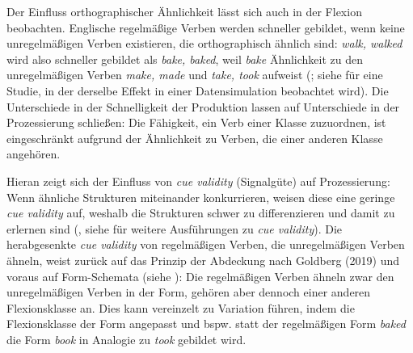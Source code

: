 Der Einfluss orthographischer Ähnlichkeit lässt sich auch in der Flexion beobachten. Englische regelmäßige Verben werden schneller gebildet, wenn keine unregelmäßigen Verben existieren, die orthographisch ähnlich sind: \textit{walk, walked} wird also schneller gebildet als \textit{bake, baked}, weil \textit{bake} Ähnlichkeit zu den unregelmäßigen Verben \textit{make, made} und \textit{take, took} aufweist (\cite[102--104]{Seidenberg.1992}; siehe \cite[371--387]{Daugherty.1994} für eine Studie, in der derselbe Effekt in einer Datensimulation beobachtet wird). Die Unterschiede in der Schnelligkeit der Produktion lassen auf Unterschiede in der Prozessierung schließen: Die Fähigkeit, ein Verb einer Klasse zuzuordnen, ist eingeschränkt aufgrund der Ähnlichkeit zu Verben, die einer anderen Klasse angehören. 

Hieran zeigt sich der Einfluss von \textit{cue validity} (Signalgüte) auf Prozessierung: Wenn ähnliche Strukturen miteinander konkurrieren, weisen diese eine geringe \textit{cue validity} auf, weshalb die Strukturen schwer zu differenzieren und damit zu erlernen sind (\cite[153]{Ellis.2002b}, siehe  für weitere Ausführungen zu \textit{cue validity}). Die herabgesenkte \textit{cue validity} von regelmäßigen Verben, die unregelmäßigen Verben ähneln, weist zurück auf das Prinzip der Abdeckung nach Goldberg (2019) und voraus auf Form-Schemata (siehe ): Die regelmäßigen Verben ähneln zwar den unregelmäßigen Verben in der Form, gehören aber dennoch einer anderen Flexionsklasse an. Dies kann vereinzelt zu Variation führen, indem die Flexionsklasse der Form angepasst und bspw. statt der regelmäßigen Form \textit{baked} die Form \textit{book} in Analogie zu \textit{took} gebildet wird.
 
